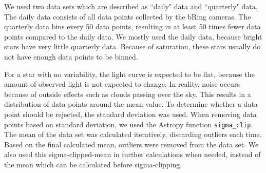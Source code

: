 \documentclass[onecolumn]{aa} %
\begin{document}
We used two data sets which are described as ``daily" data and ``quarterly" data. The daily data consists of all data points collected by the bRing cameras. The quarterly data bins every 50 data points, resulting in at least 50 times fewer data points compared to the daily data. We mostly used the daily data, because bright stars have very little quarterly data. Because of saturation, these stars usually do not have enough data points to be binned. 

For a star with no variability, the light curve is expected to be flat, because the amount of observed light is not expected to change. In reality, noise occurs because of outside effects such as clouds passing over the sky. This results in a distribution of data points around the mean value. To determine whether a data point should be rejected, the standard deviation was used. When removing data points based on standard deviation, we used the Astropy function \texttt{sigma\_clip}. The mean of the data set was calculated iteratively, discarding outliers each time. Based on the final calculated mean, outliers were removed from the data set. We also used this sigma-clipped-mean in further calculations when needed, instead of the mean which can be calculated before sigma-clipping.
\end{document}
